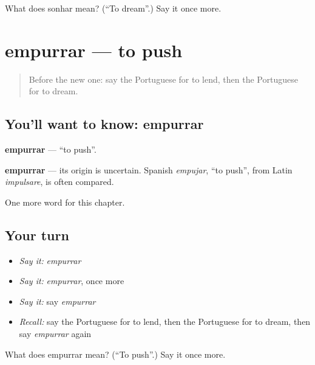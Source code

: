 \begin{tcolorbox}[breakable,colback=teal!4,colframe=teal!35!black,title={Before you move on}]
What does sonhar mean? (\textquotedblleft{}To dream\textquotedblright{}.) Say it once more.
\end{tcolorbox}
\section[empurrar]{empurrar — to push}

\label{lesson:PT-C236-empurrar}



\begin{quote}
Before the new one: say the Portuguese for to lend, then the Portuguese for to dream.
\end{quote}

\subsection*{You'll want to know: empurrar}
\textbf{empurrar} — \textquotedblleft{}to push\textquotedblright{}.

\begin{cousinweb}
\textbf{empurrar} — its origin is uncertain. Spanish \emph{empujar}, \textquotedblleft{}to push\textquotedblright{}, from Latin \emph{impulsare}, is often compared.
\end{cousinweb}

\begin{grammarlens}[title={What you've built}]
One more word for this chapter.
\end{grammarlens}

\subsection*{Your turn}
\begin{itemize}
\raggedright
  \item \emph{Say it:} \emph{empurrar}
  \item \emph{Say it:} \emph{empurrar}, once more
  \item \emph{Say it:} say \emph{empurrar}
  \item \emph{Recall:} say the Portuguese for to lend, then the Portuguese for to dream, then say \emph{empurrar} again
\end{itemize}

\begin{tcolorbox}[breakable,colback=teal!4,colframe=teal!35!black,title={Before you move on}]
What does empurrar mean? (\textquotedblleft{}To push\textquotedblright{}.) Say it once more.
\end{tcolorbox}
